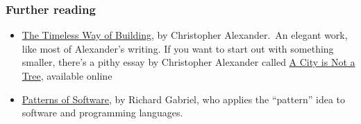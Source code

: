 \subsubsection{Further reading}

\begin{itemize}
\item
  \href{http://en.wikipedia.org/wiki/The\_Timeless\_Way\_of\_Building}{The
  Timeless Way of Building}, by Christopher Alexander.~An elegant work,
  like most of Alexander's writing. If you want to start out with
  something smaller, there's a pithy essay by Christopher Alexander
  called \href{http://www.rudi.net/pages/8755}{A City is Not a Tree},
  available online
\item
  \href{http://dreamsongs.net/Files/PatternsOfSoftware.pdf}{Patterns of
  Software}, by Richard Gabriel, who applies the ``pattern'' idea to
  software and programming languages.
\end{itemize}

~
